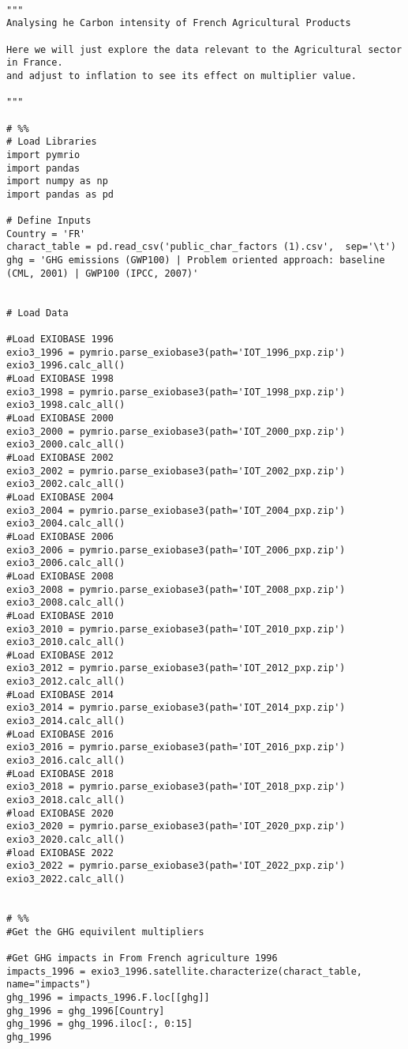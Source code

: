 \documentclass[a4paper,twoside]{article}
\begin{document}
\begin{verbatim}

"""
Analysing he Carbon intensity of French Agricultural Products

Here we will just explore the data relevant to the Agricultural sector in France. 
and adjust to inflation to see its effect on multiplier value. 

"""

# %%
# Load Libraries
import pymrio
import pandas 
import numpy as np
import pandas as pd

# Define Inputs
Country = 'FR'
charact_table = pd.read_csv('public_char_factors (1).csv',  sep='\t')
ghg = 'GHG emissions (GWP100) | Problem oriented approach: baseline (CML, 2001) | GWP100 (IPCC, 2007)'


# Load Data

#Load EXIOBASE 1996
exio3_1996 = pymrio.parse_exiobase3(path='IOT_1996_pxp.zip')
exio3_1996.calc_all()
#Load EXIOBASE 1998
exio3_1998 = pymrio.parse_exiobase3(path='IOT_1998_pxp.zip')
exio3_1998.calc_all()
#Load EXIOBASE 2000
exio3_2000 = pymrio.parse_exiobase3(path='IOT_2000_pxp.zip')
exio3_2000.calc_all()
#Load EXIOBASE 2002
exio3_2002 = pymrio.parse_exiobase3(path='IOT_2002_pxp.zip')
exio3_2002.calc_all()
#Load EXIOBASE 2004
exio3_2004 = pymrio.parse_exiobase3(path='IOT_2004_pxp.zip')
exio3_2004.calc_all()
#Load EXIOBASE 2006
exio3_2006 = pymrio.parse_exiobase3(path='IOT_2006_pxp.zip')
exio3_2006.calc_all()
#Load EXIOBASE 2008
exio3_2008 = pymrio.parse_exiobase3(path='IOT_2008_pxp.zip')
exio3_2008.calc_all()
#Load EXIOBASE 2010
exio3_2010 = pymrio.parse_exiobase3(path='IOT_2010_pxp.zip')
exio3_2010.calc_all()
#Load EXIOBASE 2012
exio3_2012 = pymrio.parse_exiobase3(path='IOT_2012_pxp.zip')
exio3_2012.calc_all()
#Load EXIOBASE 2014
exio3_2014 = pymrio.parse_exiobase3(path='IOT_2014_pxp.zip')
exio3_2014.calc_all()
#Load EXIOBASE 2016
exio3_2016 = pymrio.parse_exiobase3(path='IOT_2016_pxp.zip')
exio3_2016.calc_all()
#Load EXIOBASE 2018
exio3_2018 = pymrio.parse_exiobase3(path='IOT_2018_pxp.zip')
exio3_2018.calc_all()
#load EXIOBASE 2020
exio3_2020 = pymrio.parse_exiobase3(path='IOT_2020_pxp.zip')
exio3_2020.calc_all()
#load EXIOBASE 2022
exio3_2022 = pymrio.parse_exiobase3(path='IOT_2022_pxp.zip')
exio3_2022.calc_all()


# %%
#Get the GHG equivilent multipliers

#Get GHG impacts in From French agriculture 1996
impacts_1996 = exio3_1996.satellite.characterize(charact_table, name="impacts")
ghg_1996 = impacts_1996.F.loc[[ghg]]
ghg_1996 = ghg_1996[Country]
ghg_1996 = ghg_1996.iloc[:, 0:15]
ghg_1996


\end{verbatim}
\end{document}
